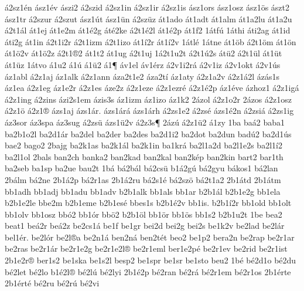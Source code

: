 {^^e12sz1^^e9n
^^e1sz1^^e9v
^^e1szi2
^^e12szid
^^e12sz1in
^^e12sz1ir
^^e12sz1is
^^e1sz1ors
^^e1sz1osz
^^e1sz1^^f6s
^^e1szt2
^^e1sz1tr
^^e12szur
^^e12szut
^^e1sz1^^fat
^^e1sz1^^fcn
^^e12sz^^fcz
^^e1t1ado
^^e1t1adt
^^e1t1alm
^^e1t1a2lu
^^e1t1a2u
^^e12t1^^e1l
^^e1t1ej
^^e1t1e2m
^^e1t1^^e92g
^^e1t^^e92ke
^^e12t1^^e92l
^^e1t1^^e92p
^^e1t1f2
1^^e1tf^^fa
1^^e1thi
^^e1ti2ag
^^e1t1id
^^e1ti2g
^^e1t1in
^^e12t1i2r
^^e12t1izm
^^e12t1izo
^^e1t1^^ed2r
^^e1t1^^ed2v
1^^e1tl^^e9
1^^e1tne
^^e1t1^^f6b
^^e12t1^^f6m
^^e1t1^^f6n
^^e1t1^^f62v
^^e1t1^^f62z
^^e12t1^^ae2
^^e1t1t2
^^e1t1ug
^^e12t1uj
1^^e12t1u2t
^^e12t1^^fa2s
^^e1t^^fc2
^^e12t1^^fcl
^^e1t1^^fct
^^e1t1^^fcz
1^^e1tvo
^^e11u2
^^e11^^fa
^^e11^^fc2
^^e11^^b6
^^e1v1el
^^e1v1^^e9rz
^^e12v1i2r^^e1
^^e12v1iz
^^e12v1okt
^^e12v1^^fas
^^e1z1abl
^^e12z1aj
^^e1z1alk
^^e12z1ann
^^e1za2t1e2
^^e1za2t^^ed
^^e1z1aty
^^e12z1a2v
^^e12z1^^e12l
^^e1z^^e1s1s
^^e1z1ea
^^e12z1eg
^^e1z1e2r
^^e12z1es
^^e1ze2z
^^e12z1eze
^^e12z1ezr^^e9
^^e12z1^^e92p
^^e1z1^^e9ve
^^e1zhoz1
^^e12z1ig^^e1
^^e12z1ing
^^e12zins
^^e1zi2s1em
^^e1zis3s
^^e1z1izm
^^e1z1izo
^^e1z1k2
2^^e1zol
^^e12z1o2r
2^^e1zos
^^e12z1osz
^^e12z1^^f6
^^e12z1^^ae
^^e1zs1aj
^^e1zs1^^e1r.
^^e1zs1^^e1r^^e1
^^e1zs1^^e1rh
^^e12zs1e2
^^e12zs^^e9
^^e1zs1^^e92n
^^e12zsi^^e1
^^e12zs1ig
^^e1z3sor
^^e1z3spa
^^e1z3sug
^^e12zs^^fc
^^e1zs1^^fc2v
^^e12z3s^^b6
2^^e1z^^fa
^^e12z1^^fc2
^^e11zy
1ba
ba^^e12
baba1
ba2b1o2l
ba2d1^^e1r
ba2del
ba2der
ba2des
ba2d1i2
ba2dot
ba2dun
bad^^fa2
ba2d1^^fas
bae2
bago2
2bajg
ba2k1as
ba2k1^^e1l
ba2k1in
ba1kr^^e1
ba2l1a2d
ba2l1e2s
ba2l1^^ed2
ba2l1ol
2bals
ban2ch
banka2
ban2kad
ban2kal
ban2k^^e9p
ban2kin
bart2
bar1th
ba2seb
ba1sp
ba2ue
bau2t
1b^^e1
b^^e12b^^e1l
b^^e12cs^^fc
b1^^e12g^^fa
b^^e12gyu
b^^e1kos1
b^^e12lan
2b^^e1lm
b^^e12ne
2b1^^e12p
b^^e12r1as
2b1^^e12ru
b^^e12s1^^e9
b^^e12sz^^f6
b^^e12t1a2
2b1^^e1td
2b1^^e1tm
bb1adh
bb1adj
bb1adu
bb1adv
b2b1alk
bb1als
bb1ar
b2b1^^e1l
b2b1e2g
bb1ela
b2b1e2le
bbe2m
b2b1eme
b2b1es^^e9
bbes1s
b2b1^^e92v
bb1is.
b2b1^^ed2r
bb1old
bb1olt
bb1olv
bb1osz
bb^^f32
bb1^^f3r
bb^^f62
b2b1^^f6l
bb1^^f6r
bb1^^f6s
bb1s2
b2b1u2t
1be
bea2
beat1
be^^e12r
be^^e12z
be2cs1^^e1
be1f
be1gr
bei2d
bei2g
bei2s
be1k2v
be2lad
be2l^^e1r
bel1^^e9r.
be2l^^f3r
be2l^^aea
be2n1^^e1
ben2n^^e1
ben2t^^e9t
beo2
be1p2
bera2n
be2rap
be2r1ar
be2ras
be2r1^^e1r
be2r1e2g
be2r1e2l^^ae
be2r1eml
ber1e2p^^e9
be2r1ev
be2rid
be2r1ist
2b1e2r^^ae
ber1s2
be1ska
be1s2l
besp2
be1spr
be1sr
be1sto
beu2
1b^^e9
b^^e92d1o
b^^e92du
b^^e92let
b^^e92lo
b1^^e92l^^ae
b^^e92l^^fa
b^^e92lyi
2b1^^e92p
b^^e92ran
b^^e92r^^e1
b^^e92r1em
b^^e92r1os
2b1^^e9rte
2b1^^e9rt^^e9
b^^e92ru
b^^e92r^^fa
b^^e92vi
}
